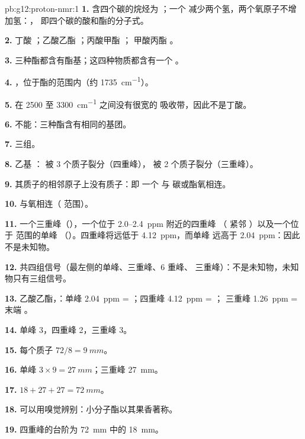\begin{solution}{pb:g12:proton-nmr:1}
\textbf{1.} 含四个碳的烷烃为 ；一个 
减少两个氢，两个氧原子不增加氢：，
即四个碳的酸和酯的分子式。

\textbf{2.} 丁酸 ；乙酸乙酯
；丙酸甲酯 ；
甲酸丙酯 。

\textbf{3.} 三种酯都含有酯基；这四种物质都含有一个
。

\textbf{4.} ，位于酯的范围内（约 \qty{1735}{cm^{-1}}）。

\textbf{5.} 在 2500 至
\qty{3300}{cm^{-1}} 之间没有很宽的  吸收带，因此不是丁酸。

\textbf{6.} 不能：三种酯含有相同的基团。

\textbf{7.} 三组。

\textbf{8.} 乙基 ： 被 3 个质子裂分（四重峰），
 被 2 个质子裂分（三重峰）。

\textbf{9.} 其质子的相邻原子上没有质子：即
一个  与  碳或酯氧相连。

\textbf{10.}  与氧相连（ 范围）。

\textbf{11.} 一个三重峰（），一个位于 2.0--\qty{2.4}{ppm} 附近的四重峰
（ 紧邻 ）以及一个位于  范围的单峰
（）。四重峰将远低于 \qty{4.12}{ppm}，而单峰
远高于 \qty{2.04}{ppm}：因此不是未知物。

\textbf{12.} 共四组信号（最左侧的单峰、三重峰、6 重峰、
三重峰）：不是未知物，未知物只有三组信号。

\textbf{13.} 乙酸乙酯，：单峰
\qty{2.04}{ppm} = ；四重峰 \qty{4.12}{ppm} = ；
三重峰 \qty{1.26}{ppm} = 末端 。

\textbf{14.} 单峰 3，四重峰 2，三重峰 3。

\textbf{15.} 每个质子 $72 / 8 = \qty{9}{mm}$。

\textbf{16.} 单峰 $3 \times 9 = \qty{27}{mm}$；三重峰
\qty{27}{mm}。

\textbf{17.} $18 + 27 + 27 = \qty{72}{mm}$。

\textbf{18.} 可以用嗅觉辨别：小分子酯以其果香著称。

\textbf{19.} 四重峰的台阶为 \qty{72}{mm} 中的 \qty{18}{mm}。
\end{solution}
